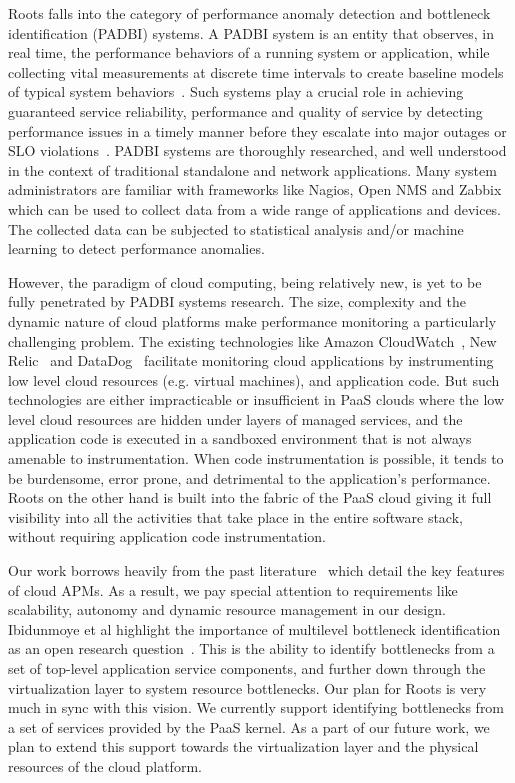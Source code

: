 Roots falls into the category of performance anomaly detection and bottleneck identification (PADBI) systems.
A PADBI system is an entity that observes, in real time, the performance behaviors
of a running system or application, while collecting vital measurements at discrete time intervals to create baseline
models of typical system behaviors~\cite{Ibidunmoye:2015:PAD:2808687.2791120}. 
Such systems play a crucial role in achieving guaranteed service reliability, performance and
quality of service by detecting performance issues in a timely manner before they escalate into major outages
or SLO violations~\cite{6045942}. 
PADBI systems are thoroughly researched, and well understood in the context of traditional standalone and
network applications. Many system administrators are familiar with frameworks like Nagios, Open NMS and Zabbix which
can be used to collect data from a wide range of applications and devices. The collected data can be
subjected to statistical analysis and/or machine learning to detect performance anomalies. 

However, the paradigm of cloud computing, being relatively new, is yet to be
fully penetrated by PADBI systems research. The size, complexity and the dynamic nature of 
cloud platforms make performance monitoring a particularly challenging problem.
The existing technologies like Amazon CloudWatch~\cite{cloudwatch},
New Relic~\cite{newrelic} and DataDog~\cite{datadog} facilitate monitoring cloud applications 
by instrumenting low level cloud resources (e.g. virtual machines), and application code. But such technologies
are either impracticable or insufficient in
PaaS clouds where the low level cloud resources are hidden under layers of managed
services, and the application code is executed in a sandboxed environment that is not
always amenable to instrumentation. When code instrumentation is possible, it tends to be
burdensome, error prone, and detrimental to the application's performance. Roots on the other hand is built into the 
fabric of the PaaS cloud giving it full visibility into all the activities that take place in the entire
software stack, without requiring application code instrumentation.

Our work borrows heavily from the past literature~\cite{DaCunhaRodrigues:2016:MCC:2851613.2851619,Ibidunmoye:2015:PAD:2808687.2791120} 
which detail the key features of cloud APMs. As a result, we pay special attention to requirements like
scalability, autonomy and dynamic resource management in our design.
Ibidunmoye et al highlight the importance of multilevel bottleneck identification as an open research
question~\cite{Ibidunmoye:2015:PAD:2808687.2791120}. This is the ability to
identify bottlenecks from a set of top-level application service components, and further down through the 
virtualization layer to system resource bottlenecks. Our plan for Roots is very much in sync with this
vision. We currently support identifying bottlenecks from a set of services provided by the PaaS kernel.
As a part of our future work, we plan to extend this support towards the virtualization layer and the
physical resources of the cloud platform.

